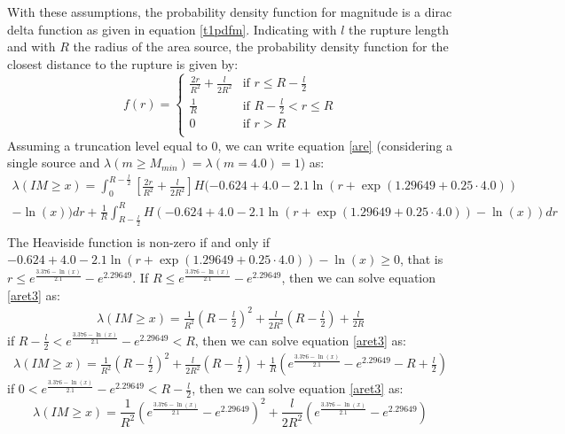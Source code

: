 With these assumptions, the probability density function for magnitude is a
dirac delta function as given in equation \ref{t1pdfm}. 
%
Indicating with $l$ the rupture length and with $R$ the radius of the area
source, the probability density function for the closest distance to the rupture
is given by:
\begin{equation}
f(r) = 
\begin{cases}
\frac{2r}{R^{2}} + \frac{l}{2R^{2}} & \text{if } r \leq R - \frac{l}{2} \\
\frac{1}{R}         & \text{if } R - \frac{l}{2} < r \leq R \\
0                         &   \text{if } r > R \\
\end{cases}
\end{equation}
Assuming a truncation level equal to 0, we can write equation \ref{are} (considering a single source and $\lambda(m\geq M_{min}) = \lambda(m=4.0) = 1$) as:
\begin{eqnarray}
    \label{aret3}
    \lambda(IM \geq x) = \int_{0}^{R-\frac{l}{2}}\left[\frac{2r}{R^{2}} +
    \frac{l}{2R^{2}}\right] H(-0.624 + 4.0 - 2.1 \ln(r + \exp(1.29649 + 0.25 \cdot
    4.0)) \nonumber \\
    - \ln(x))dr + \frac{1}{R}\int_{R - \frac{l}{2}}^{R}H(-0.624 + 4.0 - 2.1 \ln(r
    + \exp(1.29649 + 0.25 \cdot 4.0)) - \ln(x))dr \nonumber \\
\end{eqnarray}
The Heaviside function is non-zero if and only if $-0.624 + 4.0 - 2.1 \ln(r +
\exp(1.29649 + 0.25 \cdot 4.0)) - \ln(x) \geq 0$, that is $r \leq e^{\frac{3.376
- \ln(x)}{2.1}} - e^{2.29649}$.
If $R\leq e^{\frac{3.376 - \ln(x)}{2.1}} - e^{2.29649}$, then we can solve equation \ref{aret3} as:
\begin{eqnarray}
\label{aret3case1}
\lambda(IM \geq x) = \frac{1}{R^{2}}(R - \frac{l}{2})^{2} + \frac{l}{2R^{2}}(R - \frac{l}{2}) + \frac{l}{2R}
\end{eqnarray}
if $R-\frac{l}{2}< e^{\frac{3.376 - \ln(x)}{2.1}} - e^{2.29649} < R$, then we can solve equation \ref{aret3} as:
\begin{eqnarray}
\label{aret3case2}
\lambda(IM \geq x) = \frac{1}{R^{2}}(R - \frac{l}{2})^{2} + \frac{l}{2R^{2}}(R -
\frac{l}{2}) + \frac{1}{R}(e^{\frac{3.376 - \ln(x)}{2.1}} - e^{2.29649} - R + \frac{l}{2})
\end{eqnarray}
if $0 < e^{\frac{3.376 - \ln(x)}{2.1}} - e^{2.29649} < R - \frac{l}{2} $, then we can solve equation \ref{aret3} as:
\begin{equation}
\label{aret3case3}
\lambda(IM \geq x) = \frac{1}{R^{2}} (e^{\frac{3.376 - \ln(x)}{2.1}} -
e^{2.29649})^{2} + \frac{l}{2R^{2}}(e^{\frac{3.376 - \ln(x)}{2.1}} - e^{2.29649})
\end{equation}
